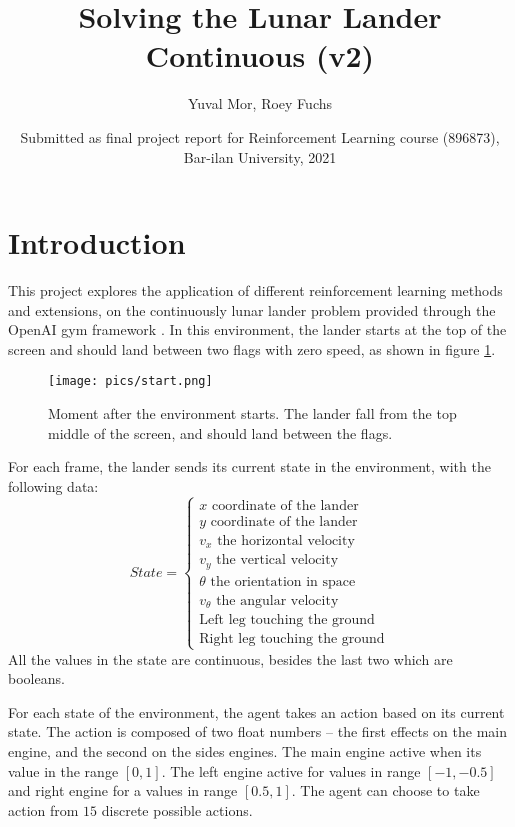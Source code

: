 \documentclass{article}
\title{Solving the Lunar Lander Continuous (v2)}
\author{Yuval Mor, Roey Fuchs }
\date{Submitted as final project report for Reinforcement Learning course (896873), \\Bar-ilan University, 2021}
\begin{document}
	
	\maketitle
	
	\section{Introduction}
	This project explores the application of different reinforcement learning methods and extensions, on the continuously lunar lander problem provided through the OpenAI gym framework \cite{1606.01540}.
	In this environment, the lander starts at the top of the screen and should land between two flags with zero speed, as shown in figure \ref{start}.	
	\begin{figure}[h!]
		\begin{center}
			\texttt{[image: pics/start.png]}
		\end{center}
		\captionsetup{width=\textwidth/2}
		\caption{Moment after the environment starts. The lander fall from the top middle of the screen, and should land between the flags.}
		\label{start}
	\end{figure}


	For each frame, the lander sends its current state in the environment, with the following data: 
	\[
	State = \begin{cases}
	x \text{ coordinate of the lander} \\
	y \text{ coordinate of the lander} \\
	v_x \text{ the horizontal velocity}\\
	v_y \text{ the vertical velocity}\\
	\theta \text{ the orientation in space} \\
	v_\theta \text{ the angular velocity} \\
	\text{Left leg touching the ground} \\
	\text{Right leg touching the ground}
	\end{cases}
	\]
	All the values in the state are continuous, besides the last two which are booleans.
	
	For each state of the environment, the agent takes an action based on its current state. The action is composed of two float numbers -- the first effects on the main engine, and the second on the sides engines. The main engine active when its value in the range $ [0, 1]$. The left engine active for values in range $ [-1, -0.5] $ and right engine for a values in range $ [0.5, 1] $. The agent can choose to take action from $15$ discrete possible actions. 
	
\end{document}
